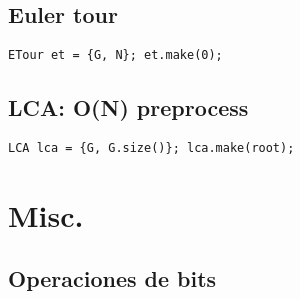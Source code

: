     \subsection{Euler tour}
        \texttt{ETour et = \{G, N\}; et.make(0);}
        
    \subsection{LCA: O(N) preprocess}
        \texttt{LCA lca = \{G, G.size()\}; lca.make(root);}

\section{Misc.}
    \subsection{Operaciones de bits}



